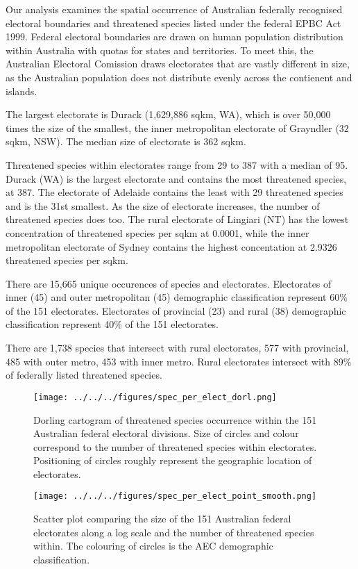 \documentclass[a4paper,11pt]{article}
\begin{document}
Our analysis examines the spatial occurrence of Australian federally recognised electoral boundaries and threatened species listed under the federal EPBC Act 1999. Federal electoral boundaries are drawn on human population distribution within Australia with quotas for states and territories. To meet this, the Australian Electoral Comission draws electorates that are vastly different in size, as the Australian population does not distribute evenly across the contienent and islands. 

The largest electorate is Durack (1,629,886 sqkm, WA), which is over 50,000 times the size of the smallest, the inner metropolitan electorate of Grayndler (32 sqkm, NSW). The median size of electorate is 362 sqkm.

Threatened species within electorates range from 29 to 387 with a median of 95. Durack (WA) is the largest electorate and contains the most threatened species, at 387. The electorate of Adelaide contains the least with 29 threatened species and is the 31st smallest. As the size of electorate increases, the number of threatened species does too. The rural electorate of Lingiari (NT) has the lowest concentration of threatened species per sqkm at 0.0001, while the inner metropolitan electorate of Sydney contains the highest concentation at 2.9326 threatened species per sqkm.

There are 15,665 unique occurences of species and electorates. 
Electorates of inner (45) and outer metropolitan (45) demographic classification represent 60\% of the 151 electorates.
Electorates of provincial (23) and rural (38) demographic classification represent 40\% of the 151 electorates. 

There are 1,738 species that intersect with rural electorates, 577 with provincial, 485 with outer metro, 453 with inner metro. 
Rural electorates intersect with 89\% of federally listed threatened species.


\begin{figure}[H]
	\centering
    \texttt{[image: ../../../figures/spec\_per\_elect\_dorl.png]}
    \caption{Dorling cartogram of threatened species occurrence within the 151 Australian federal electoral divisions. Size of circles and colour correspond to the number of threatened species within electorates. Positioning of circles roughly represent the geographic location of electorates.}
    \label{fig:dorl}
\end{figure}

\begin{figure}[H]
	\centering
    \texttt{[image: ../../../figures/spec\_per\_elect\_point\_smooth.png]}
    \caption{Scatter plot comparing the size of the 151 Australian federal electorates along a log scale and the number of threatened species within. The colouring of circles is the AEC demographic classification.}
    \label{fig:point_smooth}
\end{figure}
\end{document}
